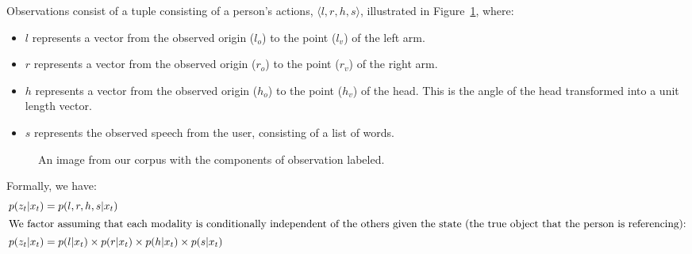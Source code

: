 \documentclass[a4paper, 11pt]{article} %
\begin{document}
Observations consist of a tuple consisting of a person's actions,
$\langle l, r, h, s\rangle $, illustrated in Figure~\ref{fig:labeled_obs}, where:
\begin{itemize}
    \item $l$ represents a vector from the observed origin ($l_o$) to the point ($l_v$) of the left arm.
    \item $r$ represents a vector from the observed origin ($r_o$) to the point ($r_v$) of the right arm.
    \item $h$ represents a vector from the observed origin ($h_o$) to the point ($h_v$) of the head. This is the angle of the head transformed into a unit length vector.
    \item $s$ represents the observed speech from the user,
          consisting of a list of words.
    \end{itemize}

\begin{figure}[h]
\centering
{}
\caption{An image from our corpus with the components of observation labeled.\label{fig:labeled_obs}}
\end{figure}
Formally, we have:
\begin{align}
p(z_t | x_t) &= p(l, r, h, s | x_t)\\
\intertext{We factor assuming that each modality is conditionally independent of the others given the state (the true object that the person is referencing):}
p(z_t | x_t) &= p(l | x_t) \times p(r | x_t) \times p(h | x_t) \times p(s | x_t)
\end{align}
\end{document}
